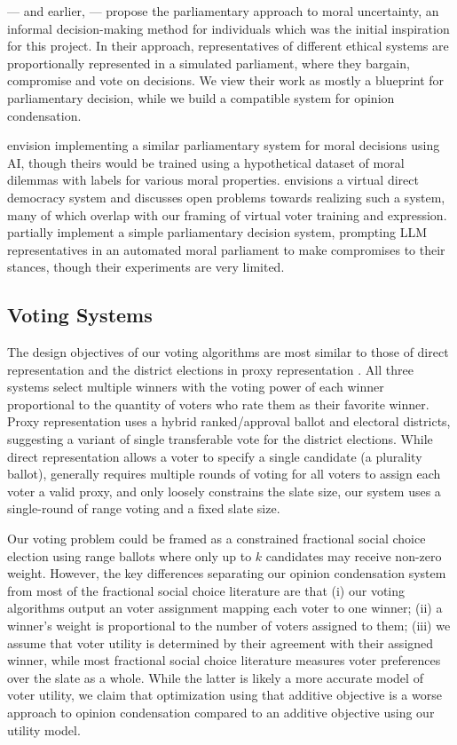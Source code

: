 \documentclass[11pt]{article}
\begin{document}
\citet{newberry-moral-parliaments} — and earlier, \citet{bostrom-moral-parliaments-2009} — propose the parliamentary approach to moral uncertainty, an informal decision-making method for individuals which was the initial inspiration for this project. In their approach, representatives of different ethical systems are proportionally represented in a simulated parliament, where they bargain, compromise and vote on decisions. We view their work as mostly a blueprint for parliamentary decision, while we build a compatible system for opinion condensation.

\citet{conitzer-2017-moral-ai} envision implementing a similar parliamentary system for moral decisions using AI, though theirs would be trained using a hypothetical dataset of moral dilemmas with labels for various moral properties. \citet{grandi-agent-mediated} envisions a virtual direct democracy system and discusses open problems towards realizing such a system, many of which overlap with our framing of virtual voter training and expression. \citet{ouwerx-parliaments} partially implement a simple parliamentary decision system, prompting LLM representatives in an automated moral parliament to make compromises to their stances, though their experiments are very limited. 

\subsection{Voting Systems}
The design objectives of our voting algorithms are most similar to those of direct representation \citep{direct-representation} and the district elections in proxy representation \citep{proxy-representation}. All three systems select multiple winners with the voting power of each winner proportional to the quantity of voters who rate them as their favorite winner. Proxy representation uses a hybrid ranked/approval ballot and electoral districts, suggesting a variant of single transferable vote for the district elections. While direct representation allows a voter to specify a single candidate (a plurality ballot), generally requires multiple rounds of voting for all voters to assign each voter a valid proxy, and only loosely constrains the slate size, our system uses a single-round of range voting and a fixed slate size. 

Our voting problem could be framed as a constrained fractional social choice \citep{aziz-randomized-2015} election using range ballots where only up to $k$ candidates may receive non-zero weight. However, the key differences separating our opinion condensation system from most of the fractional social choice literature are that (i) our voting algorithms output an voter assignment mapping each voter to one winner; (ii) a winner’s weight is proportional to the number of voters assigned to them; (iii) we assume that voter utility is determined by their agreement with their assigned winner, while most fractional social choice literature measures voter preferences over the slate as a whole. While the latter is likely a more accurate model of voter utility, we claim that optimization using that additive objective is a worse approach to opinion condensation compared to an additive objective using our utility model.
\end{document}
